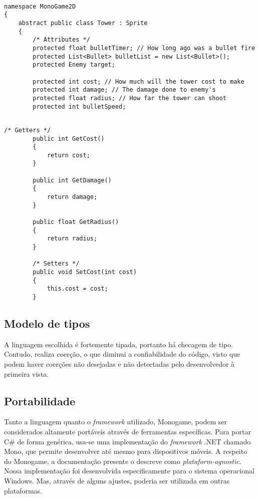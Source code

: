 \documentclass[rel_mlp]{iiufrgs}
\begin{document}
\begin{lstlisting}[caption=Trecho de código C\# retirado da implementação deste trabalho, label=lst:test]

namespace MonoGame2D
{
    abstract public class Tower : Sprite
	{
		/* Attributes */
        protected float bulletTimer; // How long ago was a bullet fire
		protected List<Bullet> bulletList = new List<Bullet>();
        protected Enemy target;

        protected int cost; // How much will the tower cost to make
        protected int damage; // The damage done to enemy's
        protected float radius; // How far the tower can shoot
		protected int bulletSpeed;

\end{lstlisting}

\begin{lstlisting}[caption=Trecho de código C\# retirado da implementação deste trabalho, label=lst:test]

/* Getters */
        public int GetCost()
		{
            return cost;
        }

        public int GetDamage()
        {
            return damage;
		}

        public float GetRadius()
        {
			return radius;
		}

		/* Setters */
		public void SetCost(int cost)
		{
            this.cost = cost;
        }

\end{lstlisting}

\subsection{Modelo de tipos}

A linguagem escolhida é fortemente tipada, portanto há checagem de tipo. Contudo, realiza coerção, o que diminui a confiabilidade do código, visto que podem haver coerções não desejadas e não detectadas pelo desenvolvedor à primeira vista.

\subsection{Portabilidade}

Tanto a linguagem quanto o \textit{framework} utilizado, Monogame, podem ser considerados altamente portáveis através de ferramentas específicas. Para portar C\# de forma genérica, usa-se uma implementação do \textit{framework} .NET chamado Mono, que permite desenvolver até mesmo para dispositivos móveis. A respeito do Monogame, a documentação presente o descreve como \textit{plataform-agnostic}. Nossa implementação foi desenvolvida especificamente para o sistema operacional Windows. Mas, através de alguns ajustes, poderia ser utilizada em outras plataformas.
\end{document}
